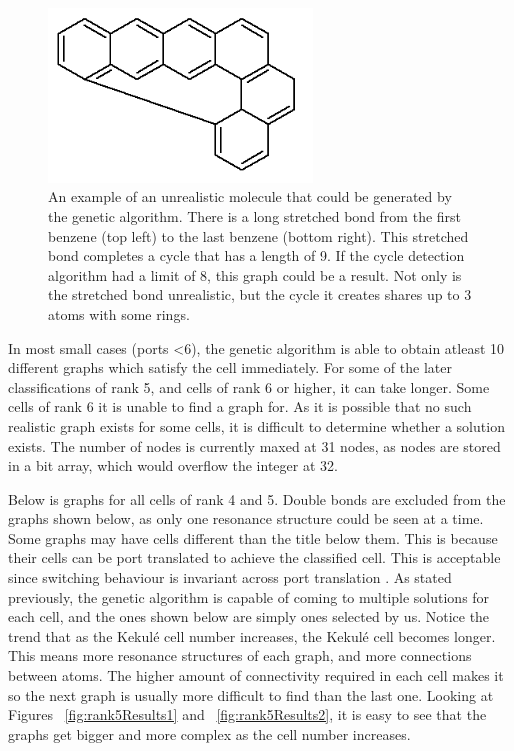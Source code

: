 \documentclass[12pt]{article}
\begin{document}
\begin{figure}[ht!]
\centering
\includegraphics[width=70mm]{unrealistic.png}
\caption{An example of an unrealistic molecule that could be generated by the genetic algorithm. There is a long stretched bond from the first benzene (top left) to the last benzene (bottom right). This stretched bond completes a cycle that has a length of 9. If the cycle detection algorithm had a limit of 8, this graph could be a result. Not only is the stretched bond unrealistic, but the cycle it creates shares up to 3 atoms with some rings.}
\label{fig:unrealistic}
\end{figure}
 
In most small cases (ports \textless 6), the genetic algorithm is able to obtain atleast 10 different graphs which satisfy the cell immediately. For some of the later classifications of rank 5, and cells of rank 6 or higher, it can take longer. Some cells of rank 6 it is unable to find a graph for. As it is possible that no such realistic graph exists for some cells, it is difficult to determine whether a solution exists. The number of nodes is currently maxed at 31 nodes, as nodes are stored in a bit array, which would overflow the integer at 32.

Below is graphs for all cells of rank 4 and 5. Double bonds are excluded from the graphs shown below, as only one resonance structure could be seen at a time. Some graphs may have cells different than the title below them. This is because their cells can be port translated to achieve the classified cell. This is acceptable since switching behaviour is invariant across port translation \cite{HH13}. As stated previously, the genetic algorithm is capable of coming to multiple solutions for each cell, and the ones shown below are simply ones selected by us. Notice the trend that as the Kekul\'e cell number increases, the Kekul\'e cell becomes longer. This means more resonance structures of each graph, and more connections between atoms. The higher amount of connectivity required in each cell makes it so the next graph is usually more difficult to find than the last one. Looking at Figures ~\ref{fig:rank5Results1} and ~\ref{fig:rank5Results2}, it is easy to see that the graphs get bigger and more complex as the cell number increases. 
\end{document}
